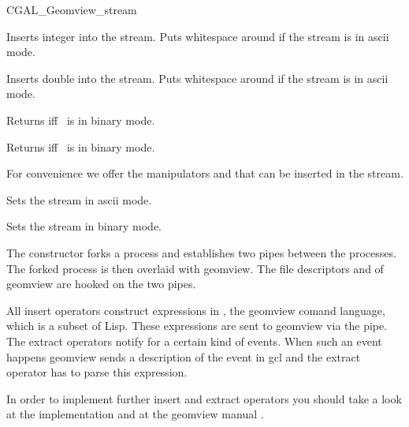 \begin{ccClass}{CGAL_Geomview_stream}
\begin{ccAdvanced}
{Inserts integer  into the stream. Puts whitespace around if the
stream is in ascii mode.}


{Inserts double  into the stream. Puts whitespace around if the
stream is in ascii mode.}

{Returns  iff \ccVar\ is in binary mode.}

{Returns  iff \ccVar\ is in binary mode.}


For convenience we offer the manipulators  and 
that can be inserted in the stream.

{Sets the stream in ascii mode.}

{Sets the stream in binary mode.}

\end{ccAdvanced}


\ccImplementation

The constructor forks a process and establishes two pipes between the
processes. The forked process is then overlaid with geomview. The
file descriptors  and  of geomview are hooked
on the two pipes.

All insert operators construct expressions in , the geomview
comand language, which is a subset of {\sc Lisp}. These expressions
are sent to geomview via the pipe. The extract operators notify 
for a certain kind of events. When such an event happens geomview
sends a description of the event in gcl and the extract operator has
to parse this expression.

In order to implement further insert and extract operators you should
take a look at the implementation \cite{f-higso-97} and at the geomview
manual \cite{p-gmgv16-96}.
\end{ccClass}

